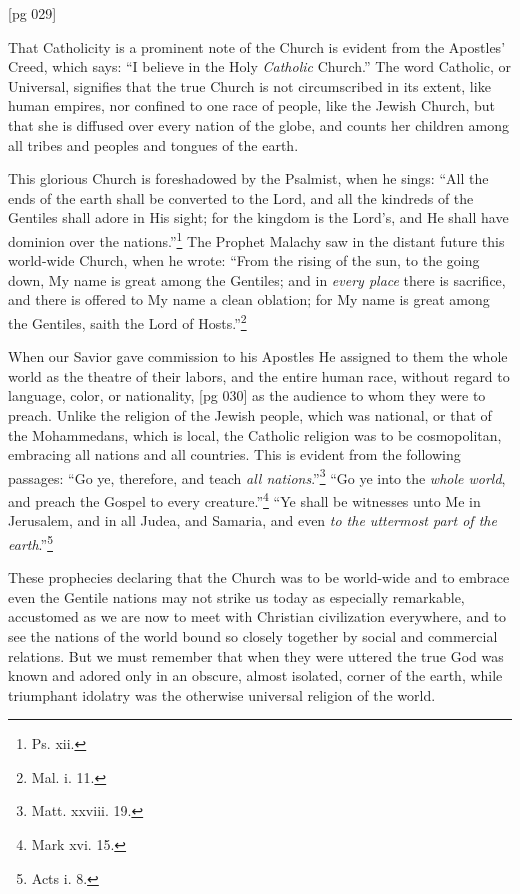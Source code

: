 [pg 029]


That Catholicity is a prominent note of the
Church is evident from the Apostles' Creed,
which says: “I believe in the Holy \emph{Catholic}
Church.” The word Catholic, or Universal, signifies
that the true Church is not circumscribed in
its extent, like human empires, nor confined to one
race of people, like the Jewish Church, but that she
is diffused over every nation of the globe, and
counts her children among all tribes and peoples
and tongues of the earth.

This glorious Church is foreshadowed by the
Psalmist, when he sings: “All the ends of the
earth shall be converted to the Lord, and all the
kindreds of the Gentiles shall adore in His sight;
for the kingdom is the Lord's, and He shall have
dominion over the nations.”\footnote{Ps. xii.} The Prophet
Malachy saw in the distant future this world-wide
Church, when he wrote: “From the rising of the
sun, to the going down, My name is great among
the Gentiles; and in \emph{every place} there is sacrifice,
and there is offered to My name a clean oblation;
for My name is great among the Gentiles, saith the
Lord of Hosts.”\footnote{Mal. i. 11.}

When our Savior gave commission to his Apostles
He assigned to them the whole world as the
theatre of their labors, and the entire human race,
without regard to language, color, or nationality,
[pg 030]
as the audience to whom they were to preach.
Unlike the religion of the Jewish people, which
was national, or that of the Mohammedans, which
is local, the Catholic religion was to be cosmopolitan,
embracing all nations and all countries. This
is evident from the following passages: “Go ye,
therefore, and teach \emph{all nations}.”\footnote{Matt.
xxviii. 19.} “Go ye into
the \emph{whole world}, and preach the Gospel to every
creature.”\footnote{Mark xvi. 15.} “Ye shall be witnesses unto Me in
Jerusalem, and in all Judea, and Samaria, and
even \emph{to the uttermost part of the earth}.”\footnote{Acts
i. 8.}

These prophecies declaring that the Church was
to be world-wide and to embrace even the Gentile
nations may not strike us today as especially remarkable,
accustomed as we are now to meet with
Christian civilization everywhere, and to see the
nations of the world bound so closely together by
social and commercial relations. But we must remember
that when they were uttered the true God
was known and adored only in an obscure, almost
isolated, corner of the earth, while triumphant
idolatry was the otherwise universal religion of
the world.

